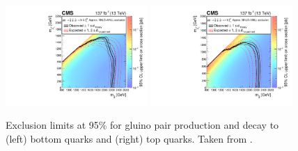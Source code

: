 \begin{figure}[htbp]
  \centering
    \includegraphics[width=0.48\textwidth]{figures/MT2_2019/Figure_012-a}
    \includegraphics[width=0.48\textwidth]{figures/MT2_2019/Figure_012-b}
    \caption[Exclusion limits for gluino pair production and decay to bottom (left) and top (right) quarks.]{Exclusion limits at 95\% \CL for gluino pair production and decay to (left) bottom quarks and (right) top quarks. Taken from \cite{MT2_2019}.}
    \label{fig:t1x}
\end{figure}

